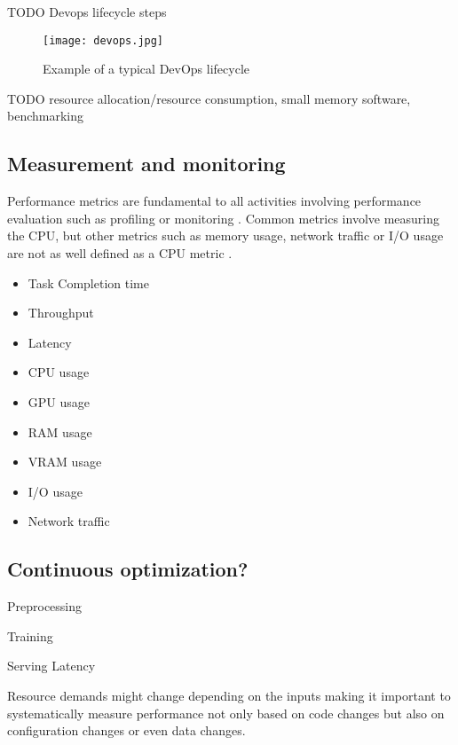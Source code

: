 TODO Devops lifecycle steps

\begin{figure}[h]
    \centering
    \texttt{[image: devops.jpg]}
    \caption{Example of a typical DevOps lifecycle}
    \label{fig:devops}
\end{figure}


TODO resource allocation/resource consumption, small memory software, benchmarking

\subsection{Measurement and monitoring}

Performance metrics are fundamental to all activities involving performance evaluation such as profiling or monitoring \parencite{brunnertPerformanceorientedDevOpsResearch2015}. Common metrics involve measuring the CPU, but other metrics such as memory usage, network traffic or I/O usage are not as well defined as a CPU metric \parencite{brunnertPerformanceorientedDevOpsResearch2015}.

\begin{itemize}
    \item Task Completion time
    \item Throughput
    \item Latency
    \item CPU usage
    \item GPU usage
    \item RAM usage
    \item VRAM usage
    \item I/O usage
    \item Network traffic
\end{itemize}

\subsection{Continuous optimization?}

Preprocessing

Training

Serving Latency

Resource demands might change depending on the inputs \parencite{brunnertPerformanceorientedDevOpsResearch2015} making it important to systematically measure performance not only based on code changes but also on configuration changes or even data changes.

